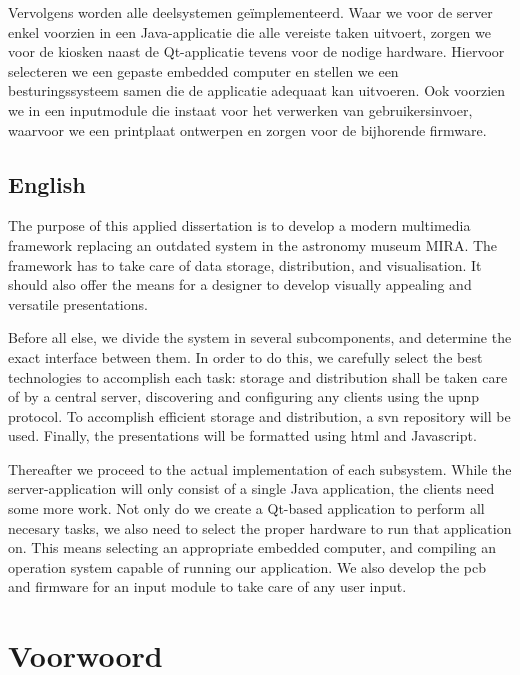 Vervolgens worden alle deelsystemen geïmplementeerd. Waar we voor de server enkel voorzien in een Java-applicatie die alle vereiste taken uitvoert, zorgen we voor de kiosken naast de Qt-applicatie tevens voor de nodige hardware. Hiervoor selecteren we een gepaste embedded computer en stellen we een besturingssysteem samen die de applicatie adequaat kan uitvoeren. Ook voorzien we in een inputmodule die instaat voor het verwerken van gebruikersinvoer, waarvoor we een printplaat ontwerpen en zorgen voor de bijhorende firmware.

\newpage

\section*{English} The purpose of this applied dissertation is to develop a modern multimedia framework replacing an outdated system in the astronomy museum MIRA. The framework has to take care of data storage, distribution, and visualisation. It should also offer the means for a designer to develop visually appealing and versatile presentations.

Before all else, we divide the system in several subcomponents, and determine the exact interface between them. In order to do this, we carefully select the best technologies to accomplish each task: storage and distribution shall be taken care of by a central server, discovering and configuring any clients using the \acs{upnp} protocol. To accomplish efficient storage and distribution, a \acs{svn} repository will be used. Finally, the presentations will be formatted using \acs{html} and Javascript.

Thereafter we proceed to the actual implementation of each subsystem. While the server-application will only consist of a single Java application, the clients need some more work. Not only do we create a Qt-based application to perform all necesary tasks, we also need to select the proper hardware to run that application on. This means selecting an appropriate embedded computer, and compiling an operation system capable of running our application. We also develop the \acs{pcb} and firmware for an input module to take care of any user input.


%
%

\chapter*{Voorwoord}

